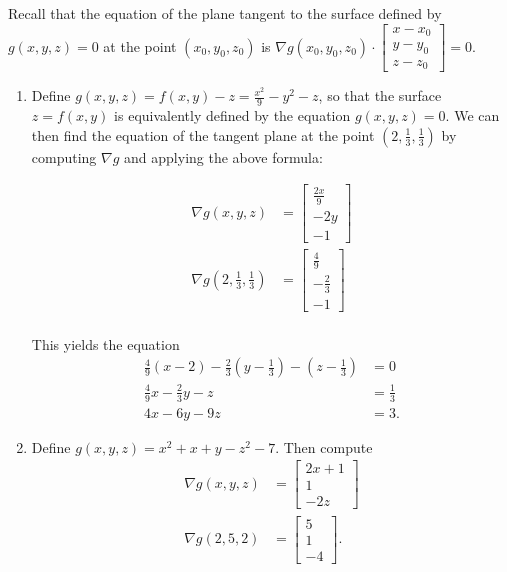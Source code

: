 \documentclass{article}
\begin{document}
\begin{enumerate}
 Recall that the equation of the plane tangent to the surface defined by 
 $g(x,y,z) = 0$ at the point $(x_0, y_0, z_0)$ is $\nabla g(x_0,y_0,z_0)
 \cdot \begin{bmatrix} x - x_0 \\ y - y_0 \\ z - z_0 \end{bmatrix} = 0$.

 \begin{enumerate}
  \item Define $g(x,y,z) = f(x,y) - z = \frac{x^2}{9} - y^2 - z$, so that the 
   surface  $z = f(x,y)$ is equivalently defined by the equation
   $g(x,y,z) = 0$.
   We can then find the equation of the tangent plane at the point 
   $(2, \frac{1}{3}, \frac{1}{3})$ by computing $\nabla g$ and applying the 
   above formula:

   \begin{align*}
    \nabla g(x,y,z) &=
     \begin{bmatrix} \frac{2x}{9} \\ -2y \\ -1 \end{bmatrix} \\
    \nabla g(2,\frac{1}{3},\frac{1}{3}) &=
     \begin{bmatrix} \frac{4}{9} \\ -\frac{2}{3} \\ -1 \end{bmatrix} \\
   \end{align*}

   This yields the equation
   \begin{align*}
    \frac{4}{9}(x - 2) - \frac{2}{3}(y - \frac{1}{3}) - (z - \frac{1}{3}) &= 0 \\
    \frac{4}{9}x - \frac{2}{3}y - z &= \frac{1}{3} \\
    4x - 6y - 9z &= 3.
   \end{align*}

  \item Define $g(x,y,z) = x^2 + x + y - z^2 - 7$.  Then compute
   \begin{align*}
    \nabla g(x,y,z) &= \begin{bmatrix} 2x + 1 \\ 1 \\ -2z \end{bmatrix} \\
    \nabla g(2,5,2) &= \begin{bmatrix} 5 \\ 1 \\ -4 \end{bmatrix}.
   \end{align*}


\end{enumerate}
\end{enumerate}
\end{document}
